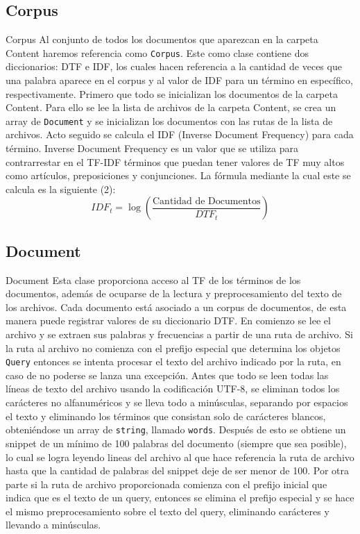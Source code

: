 \subsection{Corpus}
\begin{frame}[fragile]{Corpus}
    Al conjunto de todos los documentos que aparezcan en la carpeta Content haremos referencia como \texttt{Corpus}.
Este como clase contiene dos diccionarios: DTF e IDF, los cuales hacen referencia a la cantidad de veces que una palabra
aparece en el corpus y al valor de IDF para un término en específico, respectivamente. Primero que todo se inicializan
los documentos de la carpeta Content. Para ello se lee la lista de archivos de la carpeta Content, se crea un array de
\texttt{Document} y se inicializan los documentos con las rutas de la lista de archivos.
    Acto seguido se calcula el IDF (Inverse Document Frequency) para cada término. Inverse Document Frequency es un valor
que se utiliza para contrarrestar en el TF-IDF términos que puedan tener valores de TF muy altos como artículos, preposiciones
y conjunciones. La fórmula mediante la cual este se calcula es la siguiente (2):
\begin{equation}
    IDF_t = \log\left(\frac{\text{Cantidad de Documentos}}{DTF_t}\right)
\end{equation}
\end{frame}

\subsection{Document}
\begin{frame}[fragile]{Document}
    Esta clase proporciona acceso al TF de los términos de los documentos, además de ocuparse de la lectura y
preprocesamiento del texto de los archivos. Cada documento está asociado a un corpus de documentos, de esta manera puede
registrar valores de su diccionario DTF. En comienzo se lee el archivo y se extraen sus palabras y frecuencias a partir
de una ruta de archivo. Si la ruta al archivo no comienza con el prefijo especial que determina los objetos \texttt{Query} entonces
se intenta procesar el texto del archivo indicado por la ruta, en caso de no poderse se lanza una excepción. Antes que todo se leen todas
las líneas de texto del archivo usando la codificación UTF-8, se eliminan todos los carácteres no alfanuméricos y se lleva todo a minúsculas,
separando por espacios el texto y eliminando los términos que consistan solo de carácteres blancos, obteniéndose un array de \texttt{string},
llamado \texttt{words}. Después de esto se obtiene un snippet de un mínimo de 100 palabras del documento (siempre que sea posible), lo cual se
logra leyendo lineas del archivo al que hace referencia la ruta de archivo hasta que la cantidad de palabras del snippet deje de ser menor de 100.
    Por otra parte si la ruta de archivo proporcionada comienza con el prefijo inicial que indica que es el texto de un query, entonces
se elimina el prefijo especial y se hace el mismo preprocesamiento sobre el texto del query, eliminando carácteres y llevando a minúsculas.
\end{frame}

